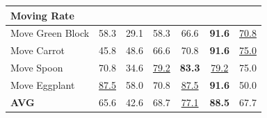\documentclass{article} %
\begin{document}
\begin{table}[h!]
{\begin{tabular}{lcccccc}
\midrule
\textbf{Moving Rate} & & & & & \\
\midrule
Move Green Block & 58.3 & 29.1 & 58.3 & 66.6 & \textbf{91.6} & \underline{70.8} \\
Move Carrot & 45.8 & 48.6 & 66.6 & 70.8 & \textbf{91.6} & \underline{75.0}\\
Move Spoon & 70.8 & 34.6 & \underline{79.2} & \textbf{83.3} & \underline{79.2}  & 75.0\\
Move Eggplant & \underline{87.5} & 58.0 & 70.8 & \underline{87.5} & \textbf{91.6} & 50.0\\
\textbf{AVG} & 65.6 & 42.6 & 68.7 & \underline{77.1} & \textbf{88.5} & 67.7\\
\bottomrule
\end{tabular}
}
\label{tab:simpler_detailed}
\end{table}
\end{document}
